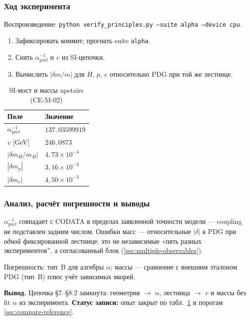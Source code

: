 \subsubsection*{Ход эксперимента}
Воспроизведение: \texttt{python verify\_principles.py --suite alpha --device cpu}.

\begin{enumerate}[label=\textbf{Шаг \arabic*:},leftmargin=*,itemsep=0.35em]
\item Зафиксировать коммит; прогнать suite \texttt{alpha}.
\item Снять $\alpha^{-1}_{\mathrm{pref}}$ и $v$ из SI-цепочки.
\item Вычислить $|\delta m/m|$ для $H$, $p$, $e$ относительно PDG при той же лестнице.
\end{enumerate}

\begin{table}[htbp]
\centering
\small
\caption{SI-мост и массы upstairs (CE-M-02)}
\label{tab:exp-ce-m-02}
\begin{tabular}{@{}ll@{}}
\toprule
Поле & Значение \\
\midrule
$\alpha^{-1}_{\mathrm{pref}}$ & $137{,}03599919$ \\
$v$ [GeV] & $246{,}0873$ \\
$|\delta m_H/m_H|$ & $4{,}73\times 10^{-4}$ \\
$|\delta m_p|$ & $3{,}16\times 10^{-3}$ \\
$|\delta m_e|$ & $4{,}50\times 10^{-3}$ \\
\bottomrule
\end{tabular}
\end{table}

\subsubsection*{Анализ, расчёт погрешности и выводы}
$\alpha^{-1}_{\mathrm{pref}}$ совпадает с CODATA в пределах заявленной точности модели --- coupling не подставлен задним числом.
Ошибки масс --- относительные $|\delta|$ к PDG при \emph{одной} фиксированной лестнице; это не независимые «пять разных экспериментов'', а согласованный блок (\cref{sec:multiple-observables}).

Погрешность: тип~B для алгебры $\alpha$; массы --- сравнение с внешним эталоном PDG (тип~B) плюс учёт зависимых якорей.

\textbf{Вывод.}
Цепочка §7--§8.2 замкнута: геометрия $\to$ $\alpha$, лестница $\to$ $v$ и массы без fit $\alpha$ из эксперимента.
\textbf{Статус записи:} опыт закрыт по табл.~\ref{tab:exp-ce-m-02} и порогам \cref{sec:compare-reference}.
